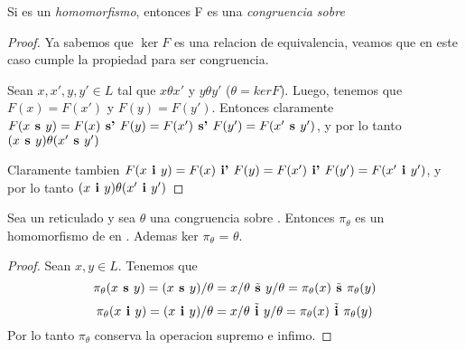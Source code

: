 \begin{lemma}
  Si  es un \emph{homomorfismo}, entonces F es una \emph{congruencia sobre} \reticulAlg
\end{lemma}
\begin{proof}
  Ya sabemos que $\ker F$ es una relacion de equivalencia, veamos que en este caso cumple la propiedad para ser congruencia.

  Sean $x, x', y, y' \in L$ tal que $x\theta x'$ y $y\theta y'$ ($\theta = ker F$). Luego, tenemos que $F(x) = F(x')$ y $F(y) = F(y')$.
  Entonces claramente $F(x\textbf{ s }y) = F(x) \textbf{ s' } F(y) = F(x') \textbf{ s' } F(y') = F(x'\textbf{ s }y')$, y por lo tanto 
  $(x\textbf{ s }y)\theta(x'\textbf{ s }y')$
  
  Claramente tambien $F(x\textbf{ i }y) = F(x) \textbf{ i' } F(y) = F(x') \textbf{ i' } F(y') = F(x'\textbf{ i }y')$, y por lo tanto $(x\textbf{ i }y)\theta(x'\textbf{ i }y')$
\end{proof}

\begin{lemma}
  Sea \reticulAlg un reticulado y sea $\theta$ una congruencia sobre \reticulAlg. Entonces $\pi_\theta$ es un 
  homomorfismo de \reticulAlg en .
  Ademas ker $\pi_\theta$ = $\theta$.
\end{lemma}
\begin{proof}
  Sean $x, y \in L$. Tenemos que
  $$
  \pi_\theta(x\textbf{ s }y) = (x\textbf{ s }y)/\theta = x/\theta \tilde{\textbf{ s }} y/\theta = \pi_\theta(x) \tilde{\textbf{ s }} \pi_\theta(y)
  $$
  $$
  \pi_\theta(x\textbf{ i }y) = (x\textbf{ i }y)/\theta = x/\theta \tilde{\textbf{ i }} y/\theta = \pi_\theta(x) \tilde{\textbf{ i }} \pi_\theta(y)
  $$
  Por lo tanto $\pi_\theta$ conserva la operacion supremo e infimo.

\end{proof}

